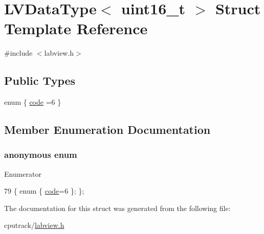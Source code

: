 \hypertarget{struct_l_v_data_type_3_01uint16__t_01_4}{}\section{L\+V\+Data\+Type$<$ uint16\+\_\+t $>$ Struct Template Reference}
\label{struct_l_v_data_type_3_01uint16__t_01_4}


{\ttfamily \#include $<$labview.\+h$>$}

\subsection*{Public Types}
\begin{DoxyCompactItemize}
\item 
enum \{ \hyperlink{struct_l_v_data_type_3_01uint16__t_01_4_aba91a2472272e8ecdd5169f9461749f7ab915236c55a49d181e5530ec94aad320}{code} =6
 \}
\end{DoxyCompactItemize}


\subsection{Member Enumeration Documentation}
\subsubsection[{\texorpdfstring{anonymous enum}{anonymous enum}}]{\setlength{\rightskip}{0pt plus 5cm}anonymous enum}\hypertarget{struct_l_v_data_type_3_01uint16__t_01_4_aba91a2472272e8ecdd5169f9461749f7}{}\label{struct_l_v_data_type_3_01uint16__t_01_4_aba91a2472272e8ecdd5169f9461749f7}
\begin{Desc}
\item[Enumerator]\par
\begin{description}
\item[{\em 
code\hypertarget{struct_l_v_data_type_3_01uint16__t_01_4_aba91a2472272e8ecdd5169f9461749f7ab915236c55a49d181e5530ec94aad320}{}\label{struct_l_v_data_type_3_01uint16__t_01_4_aba91a2472272e8ecdd5169f9461749f7ab915236c55a49d181e5530ec94aad320}
}]\end{description}
\end{Desc}

\begin{DoxyCode}
79 \{ \textcolor{keyword}{enum} \{ \hyperlink{struct_l_v_data_type_3_01uint16__t_01_4_aba91a2472272e8ecdd5169f9461749f7ab915236c55a49d181e5530ec94aad320}{code}=6 \}; \};
\end{DoxyCode}


The documentation for this struct was generated from the following file\+:\begin{DoxyCompactItemize}
\item 
cputrack/\hyperlink{labview_8h}{labview.\+h}\end{DoxyCompactItemize}
